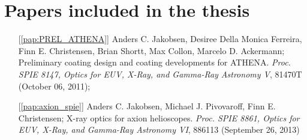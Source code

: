 \chapter{Papers included in the thesis}


\begin{itemize}

\item[{[\ref{pap:PREL_ATHENA}]}]
Anders C. Jakobsen, Desiree Della Monica Ferreira, Finn E. Christensen, Brian Shortt, Max Collon, Marcelo D. Ackermann; Preliminary coating design and coating developments for ATHENA. {\em Proc. SPIE 8147, Optics for EUV, X-Ray, and Gamma-Ray Astronomy V}, 81470T (October 06, 2011); 

\item[{[\ref{pap:axion_spie}]}]
Anders C. Jakobsen, Michael J. Pivovaroff, Finn E. Christensen; 
X-ray optics for axion helioscopes. {\em Proc. SPIE 8861, Optics for EUV, X-Ray, and Gamma-Ray Astronomy VI}, 886113 (September 26, 2013) 




\end{itemize}
